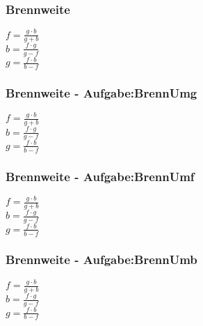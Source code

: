 \subsubsection{Brennweite} 
\begin{minipage}{0.45\textwidth} 
$ f  = \frac{g\cdot b}{g+b} $\\ 
$ b  = \frac{f\cdot g}{g-f} $\\ 
$ g  = \frac{f\cdot b}{b-f} $\\ 
\end{minipage} 
\begin{minipage}{0.45\textwidth} 
 
\end{minipage} 
\subsubsection{Brennweite - Aufgabe:BrennUmg} 
\begin{minipage}{0.45\textwidth} 
$ f  = \frac{g\cdot b}{g+b} $\\ 
$ b  = \frac{f\cdot g}{g-f} $\\ 
$ g  = \frac{f\cdot b}{b-f} $\\ 
\end{minipage} 
\begin{minipage}{0.45\textwidth} 
 
\end{minipage} 
\subsubsection{Brennweite - Aufgabe:BrennUmf} 
\begin{minipage}{0.45\textwidth} 
$ f  = \frac{g\cdot b}{g+b} $\\ 
$ b  = \frac{f\cdot g}{g-f} $\\ 
$ g  = \frac{f\cdot b}{b-f} $\\ 
\end{minipage} 
\begin{minipage}{0.45\textwidth} 
 
\end{minipage} 
\subsubsection{Brennweite - Aufgabe:BrennUmb} 
\begin{minipage}{0.45\textwidth} 
$ f  = \frac{g\cdot b}{g+b} $\\ 
$ b  = \frac{f\cdot g}{g-f} $\\ 
$ g  = \frac{f\cdot b}{b-f} $\\ 
\end{minipage} 
\begin{minipage}{0.45\textwidth} 
 
\end{minipage} 
